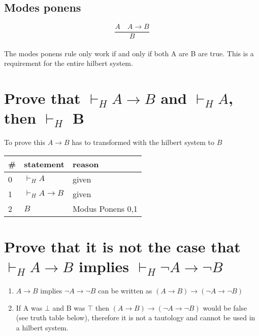 \documentclass{article}
\begin{document}
\subsection{Modes ponens}

\[\frac{A \quad A\to B}{B}\] \\

The modes ponens rule only work if and only if both A are B are true.
This is a requirement for the entire hilbert system.


\section{Prove that $\vdash_H A \to B$ and $\vdash_H A$, then $\vdash_H$ B}
To prove this $A \to B$ has to transformed with the hilbert system to $B$

\begin{tabular}{@{}l|ll@{}}
\#& statement			&reason \\ \toprule
0& $\vdash_H A$ & given \\
1& $\vdash_H A \to B$ & given \\
2& $B$ & Modus Ponens 0,1 \\
\end{tabular}

\section{Prove that it is not the case that $\vdash_H A \to B$ implies 
$ \vdash_H \neg A \to \neg B$}

\begin{enumerate}
	\item $A \to B$ implies $\neg A \to \neg B$ can be written as 
		$(A \to B) \to (\neg A \to \neg B)$
	\item If A was $\bot$ and B was $\top$ then $(A \to B) \to (\neg A \to 
		\neg B)$ would be false (see truth table below), therefore it is not a tautology and cannot
		be used in a hilbert system.
\end{enumerate}
\end{document}
